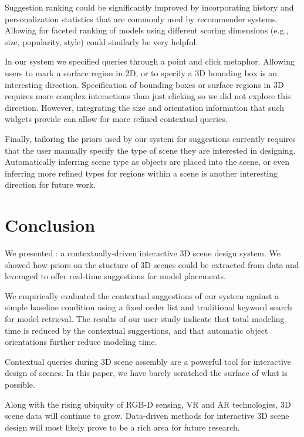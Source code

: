 \documentclass{sigchi}
\begin{document}
Suggestion ranking could be significantly improved by incorporating history and personalization statistics that are commonly used by recommender systems.  Allowing for faceted ranking  of models using different scoring dimensions (e.g., size, popularity, style) could similarly be very helpful.


In our system we specified queries through a point and click metaphor.  Allowing users to mark a surface region in 2D, or to specify a 3D bounding box is an interesting direction.  Specification of bounding boxes or surface regions in 3D requires more complex interactions than just clicking so we did not explore this direction.  However, integrating the size and orientation information that such widgets provide can allow for more refined contextual queries.

Finally, tailoring the priors used by our system for suggestions currently requires that the user manually specify the type of scene they are interested in designing.  Automatically inferring scene type as objects are placed into the scene, or even inferring more refined types for regions within a scene is another interesting direction for future work.


\section{Conclusion}

We presented \SceneSuggest: a contextually-driven interactive 3D scene design system.  We showed how priors on the stucture of 3D scenes could be extracted from data and leveraged to offer real-time suggestions for model placements.

We empirically evaluated the contextual suggestions of our system against a simple baseline condition using a fixed order list and traditional keyword search for model retrieval.  The results of our user study indicate that total modeling time is reduced by the \SceneSuggest contextual suggestions, and that automatic object orientations further reduce modeling time.

Contextual queries during 3D scene assembly are a powerful tool for interactive design of scenes.  In this paper, we have barely scratched the surface of what is possible.

Along with the rising ubiquity of RGB-D sensing, VR and AR technologies, 3D scene data will continue to grow.  Data-driven methods for interactive 3D scene design will most likely prove to be a rich area for future research.


\balance


\end{document}
